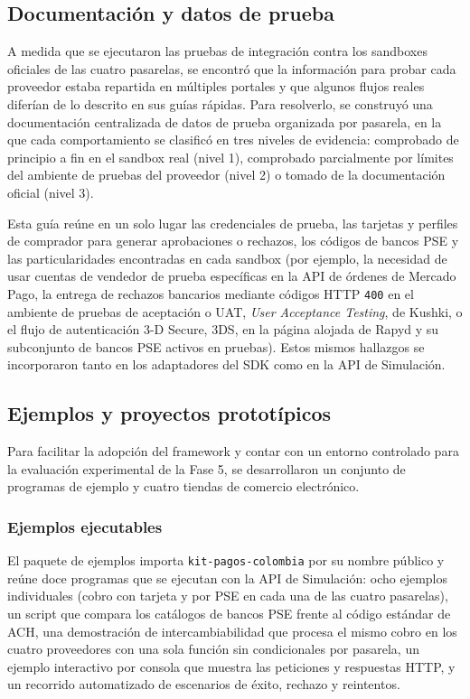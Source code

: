 \subsection{Documentación y datos de prueba}

A medida que se ejecutaron las pruebas de integración contra los sandboxes oficiales de las cuatro pasarelas, se encontró que la información para probar cada proveedor estaba repartida en múltiples portales y que algunos flujos reales diferían de lo descrito en sus guías rápidas. Para resolverlo, se construyó una documentación centralizada de datos de prueba organizada por pasarela, en la que cada comportamiento se clasificó en tres niveles de evidencia: comprobado de principio a fin en el sandbox real (nivel 1), comprobado parcialmente por límites del ambiente de pruebas del proveedor (nivel 2) o tomado de la documentación oficial (nivel 3).

Esta guía reúne en un solo lugar las credenciales de prueba, las tarjetas y perfiles de comprador para generar aprobaciones o rechazos, los códigos de bancos PSE y las particularidades encontradas en cada sandbox (por ejemplo, la necesidad de usar cuentas de vendedor de prueba específicas en la API de órdenes de Mercado Pago, la entrega de rechazos bancarios mediante códigos HTTP \texttt{400} en el ambiente de pruebas de aceptación o UAT, \textit{User Acceptance Testing}, de Kushki, o el flujo de autenticación 3-D Secure, 3DS, en la página alojada de Rapyd y su subconjunto de bancos PSE activos en pruebas). Estos mismos hallazgos se incorporaron tanto en los adaptadores del SDK como en la API de Simulación.

\subsection{Ejemplos y proyectos prototípicos}

Para facilitar la adopción del framework y contar con un entorno controlado para la evaluación experimental de la Fase 5, se desarrollaron un conjunto de programas de ejemplo y cuatro tiendas de comercio electrónico.

\subsubsection{Ejemplos ejecutables}

El paquete de ejemplos importa \texttt{kit-pagos-colombia} por su nombre público y reúne doce programas que se ejecutan con la API de Simulación: ocho ejemplos individuales (cobro con tarjeta y por PSE en cada una de las cuatro pasarelas), un script que compara los catálogos de bancos PSE frente al código estándar de ACH, una demostración de intercambiabilidad que procesa el mismo cobro en los cuatro proveedores con una sola función sin condicionales por pasarela, un ejemplo interactivo por consola que muestra las peticiones y respuestas HTTP, y un recorrido automatizado de escenarios de éxito, rechazo y reintentos.

